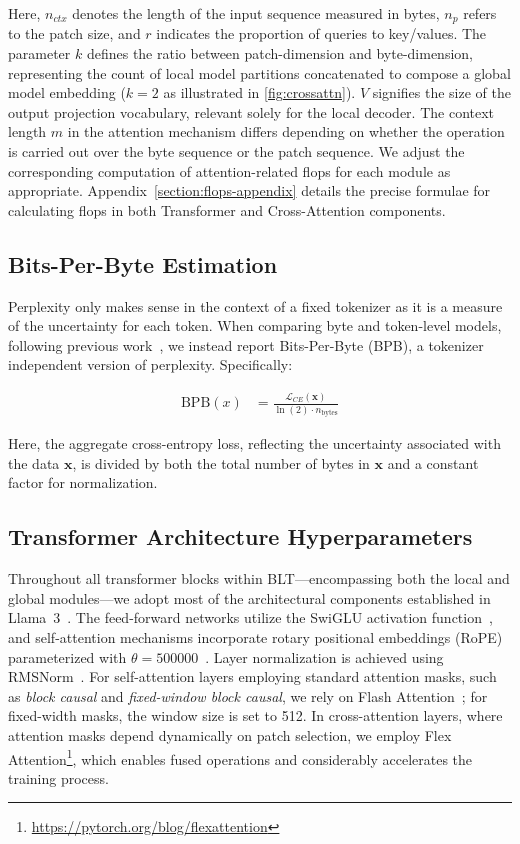Here, $n_{ctx}$ denotes the length of the input sequence measured in bytes, $n_p$ refers to the patch size, and $r$ indicates the proportion of queries to key/values. The parameter $k$ defines the ratio between patch-dimension and byte-dimension, representing the count of local model partitions concatenated to compose a global model embedding ($k=2$ as illustrated in \autoref{fig:crossattn}). $V$ signifies the size of the output projection vocabulary, relevant solely for the local decoder. The context length $m$ in the attention mechanism differs depending on whether the operation is carried out over the byte sequence or the patch sequence. We adjust the corresponding computation of attention-related flops for each module as appropriate. Appendix~\ref{section:flops-appendix} details the precise formulae for calculating flops in both Transformer and Cross-Attention components.

\subsection{Bits-Per-Byte Estimation} Perplexity only makes sense in the context of a fixed tokenizer as it is a measure of the uncertainty for each token. When comparing byte and token-level models, following previous work~\citep{xue2022byt5, yu2023megabyte, wang2024mambabyte}, we instead report Bits-Per-Byte (BPB), a tokenizer independent version of perplexity. Specifically:

\begin{align}
    \text{BPB}(x)&= \frac{\mathcal{L}_{CE}(\pmb{x})}{\ln(2)\cdot n_{\text{bytes}}}
\end{align}

Here, the aggregate cross-entropy loss, reflecting the uncertainty associated with the data $\pmb{x}$, is divided by both the total number of bytes in $\pmb{x}$ and a constant factor for normalization.

\subsection{Transformer Architecture Hyperparameters} 

Throughout all transformer blocks within {\textsc BLT}—encompassing both the local and global modules—we adopt most of the architectural components established in Llama~3~\citep{dubey2024llama}. The feed-forward networks utilize the SwiGLU activation function~\citep{swiglu}, and self-attention mechanisms incorporate rotary positional embeddings (RoPE)~\citep{RoPe} parameterized with $\theta=500000$~\citep{xiong2024effective}. Layer normalization is achieved using RMSNorm~\citep{RMSNorm}. For self-attention layers employing standard attention masks, such as \textit{block causal} and \textit{fixed-window block causal}, we rely on Flash Attention~\citep{dao2022flashattention}; for fixed-width masks, the window size is set to 512. In cross-attention layers, where attention masks depend dynamically on patch selection, we employ Flex Attention\footnote{\url{https://pytorch.org/blog/flexattention}}, which enables fused operations and considerably accelerates the training process.

